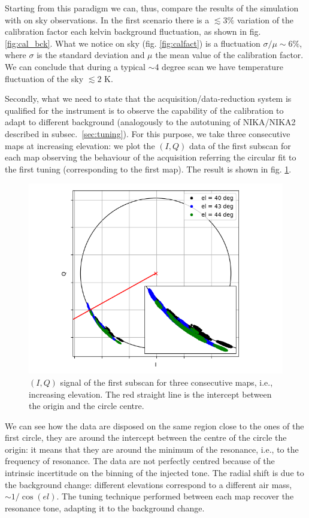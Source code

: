 \documentclass[twocolumn,traditabstract]{aa}\\
\begin{document}
Starting from this paradigm we can, thus, compare the results of the simulation with on sky observations. In the first scenario there is a $\lesssim 3\%$ variation of the calibration factor each kelvin background fluctuation, as shown in fig. \ref{fig:cal_bck}. What we notice on sky (fig. \ref{fig:calfact}) is a fluctuation $\sigma/\mu\sim6\%$, where $\sigma$ is the standard deviation and $\mu$ the mean value of the calibration factor. We can conclude that during a typical $\sim$4 degree scan we have temperature fluctuation of the sky $\lesssim 2$ K.

Secondly, what we need to state that the acquisition/data-reduction system is qualified for the instrument is to observe the capability of the calibration to adapt to different background (analogously to the autotuning of NIKA/NIKA2 described in subsec.~\ref{sec:tuning}). For this purpose, we take three consecutive maps at increasing elevation: we plot the $(I,Q)$ data of the first subscan for each map observing the behaviour of the acquisition referring the circular fit to the first tuning (corresponding to the first map). The result is shown in fig. \ref{fig:autotuning}.

\begin{figure}[htf]
	\centering
	\includegraphics[width=.5\textwidth]{4.results/autotuning.png}
	\caption{$(I,Q)$ signal of the first subscan for three consecutive maps, i.e., increasing elevation. The red straight line is the intercept between the origin and the circle centre.}
	\label{fig:autotuning}
\end{figure}

\noindent We can see how the data are disposed on the same region close to the ones of the first circle, they are around the intercept between the centre of the circle the origin: it means that they are around the minimum of the resonance, i.e., to the frequency of resonance. The data are not perfectly centred because of the intrinsic incertitude on the binning of the injected tone. The radial shift is due to the background change: different elevations correspond to a different air mass, $\sim 1/\cos(el)$. The tuning technique performed between each map recover the resonance tone, adapting it to the background change.
\end{document}
